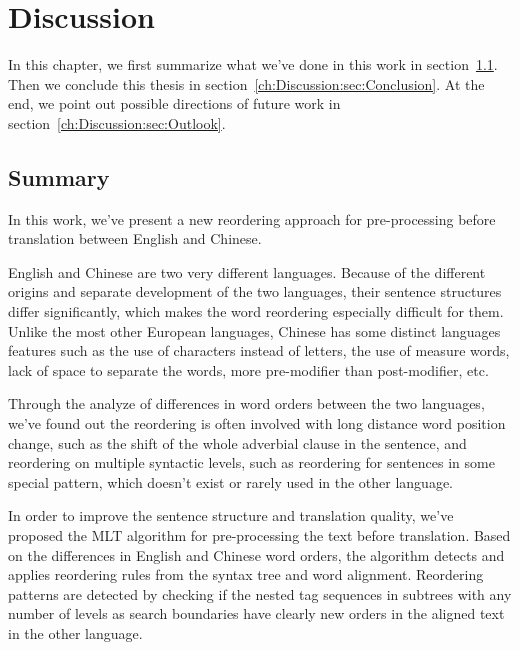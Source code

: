 

\chapter{Discussion}
\label{ch:Discussion}

In this chapter, we first summarize what we've done in this work in section~\ref{ch:Discussion:sec:Summary}. Then we conclude this thesis in section~\ref{ch:Discussion:sec:Conclusion}. At the end, we point out possible directions of future work in section~\ref{ch:Discussion:sec:Outlook}.

\section{Summary}
\label{ch:Discussion:sec:Summary}

In this work, we've present a new reordering approach for pre-processing before translation between English and Chinese.

English and Chinese are two very different languages. Because of the different origins and separate development of the two languages, their sentence structures differ significantly, which makes the word reordering especially difficult for them. Unlike the most other European languages, Chinese has some distinct languages features such as the use of characters instead of letters, the use of measure words, lack of space to separate the words, more pre-modifier than post-modifier, etc.

Through the analyze of differences in word orders between the two languages, we've found out the reordering is often involved with long distance word position change, such as the shift of the whole adverbial clause in the sentence, and reordering on multiple syntactic levels, such as reordering for sentences in some special pattern, which doesn't exist or rarely used in the other language.

In order to improve the sentence structure and translation quality, we've proposed the \acf{MLT} algorithm for pre-processing the text before translation. Based on the differences in English and Chinese word orders, the algorithm detects and applies reordering rules from the syntax tree and word alignment. Reordering patterns are detected by checking if the nested tag sequences in subtrees with any number of levels as search boundaries have clearly new orders in the aligned text in the other language.


